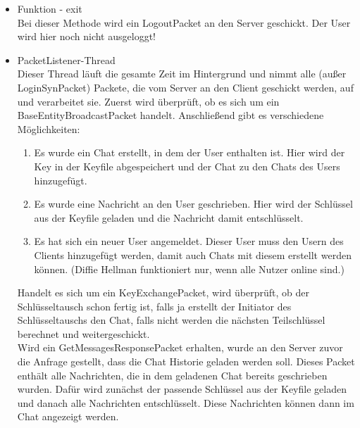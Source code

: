 \begin{itemize}
    
    \item Funktion - exit \\
    Bei dieser Methode wird ein LogoutPacket an den Server geschickt. Der User wird hier noch nicht ausgeloggt!
    
    \item PacketListener-Thread \\
    Dieser Thread läuft die gesamte Zeit im Hintergrund und nimmt alle (außer LoginSynPacket) Packete, die vom Server
    an den Client geschickt werden, auf und verarbeitet sie.
    Zuerst wird überprüft, ob es sich um ein BaseEntityBroadcastPacket handelt. Anschließend gibt es verschiedene Möglichkeiten: \\
    \begin{enumerate}
        \item Es wurde ein Chat erstellt, in dem der User enthalten ist. Hier wird der Key in der Keyfile abgespeichert
        und der Chat zu den Chats des Users hinzugefügt.
        \item Es wurde eine Nachricht an den User geschrieben. Hier wird der Schlüssel aus der Keyfile geladen und die
        Nachricht damit entschlüsselt.
        \item Es hat sich ein neuer User angemeldet. Dieser User muss den Usern des Clients hinzugefügt werden, damit auch
        Chats mit diesem erstellt werden können. (Diffie Hellman funktioniert nur, wenn alle Nutzer online sind.)
    \end{enumerate}
    
    Handelt es sich um ein KeyExchangePacket, wird überprüft, ob der Schlüsseltausch schon fertig ist,
    falls ja erstellt der Initiator des Schlüsseltauschs den Chat, falls nicht werden die nächsten
    Teilschlüssel berechnet und weitergeschickt.\\
    
    Wird ein GetMessagesResponsePacket erhalten, wurde an den Server zuvor die Anfrage gestellt, dass die Chat Historie
    geladen werden soll. Dieses Packet enthält alle Nachrichten, die in dem geladenen Chat bereits geschrieben wurden.
    Dafür wird zunächst der passende Schlüssel aus der Keyfile geladen und danach alle Nachrichten entschlüsselt.
    Diese Nachrichten können dann im Chat angezeigt werden.\\

\end{itemize}

